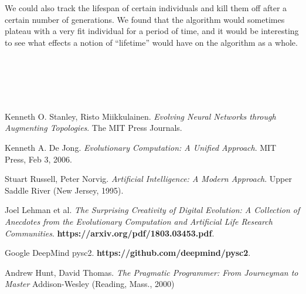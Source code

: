\documentclass{article}
\begin{document}
\begin{multicols}{2}
We could also track the lifespan of certain individuals and kill them off after
a certain number of generations. We found that the algorithm would sometimes
plateau with a very fit individual for a period of time, and it would be
interesting to see what effects a notion of ``lifetime'' would have on the
algorithm as a whole.

\end{multicols}

\\~\\
\hline
\\~\\

\begin{thebibliography}{9}
  Kenneth O. Stanley, Risto Miikkulainen.
  \textit{Evolving Neural Networks through Augmenting Topologies}. 
  The MIT Press Journals.

  Kenneth A. De Jong. \textit{Evolutionary Computation: A Unified Approach}.
  MIT Press, Feb 3, 2006.

  Stuart Russell, Peter Norvig.
  \textit{Artificial Intelligence: A Modern Approach}.
  Upper Saddle River (New Jersey, 1995).

  Joel Lehman et al.
  \textit{The Surprising Creativity of Digital Evolution: A Collection of
    Anecdotes from the Evolutionary Computation and Artificial Life Research
    Communities}.
  \textbf{https://arxiv.org/pdf/1803.03453.pdf}.

  Google DeepMind pysc2.
  \textbf{https://github.com/deepmind/pysc2}.

  Andrew Hunt, David Thomas.
  \textit{The Pragmatic Programmer: From Journeyman to Master}
  Addison-Wesley (Reading, Mass., 2000)

\end{thebibliography}
\end{document}
